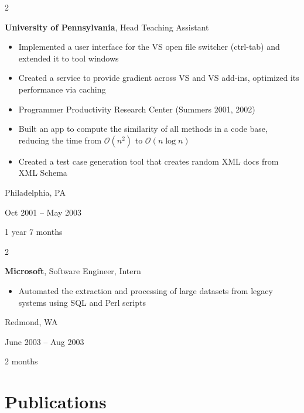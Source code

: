 \documentclass[10pt, letterpaper]{article}
\newenvironment{highlights}{
    \begin{itemize}[
        topsep=0.10 cm,
        parsep=0.10 cm,
        partopsep=0pt,
        itemsep=0pt,
        leftmargin=0.4 cm + 10pt
    ]
}{
    \end{itemize}
} %
\newenvironment{twocolentry}[2][]{
    \onecolentry
    \def\secondColumn{#2}
    \setcolumnwidth{\fill, 4.5 cm}
    \begin{paracol}{2}
}{
    \switchcolumn \raggedleft \secondColumn
    \end{paracol}
    \endonecolentry
} %
\begin{document}
        \begin{twocolentry}{
            Philadelphia, PA

        Oct 2001 – May 2003

        1 year 7 months
        }
            \textbf{University of Pennsylvania}, Head Teaching Assistant
            \begin{highlights}
                \item Implemented a user interface for the VS open file switcher (ctrl-tab) and extended it to tool windows
                \item Created a service to provide gradient across VS and VS add-ins, optimized its performance via caching
                \item Programmer Productivity Research Center (Summers 2001, 2002)
                \item Built an app to compute the similarity of all methods in a code base, reducing the time from $\mathcal{O}(n^2)$ to $\mathcal{O}(n \log n)$
                \item Created a test case generation tool that creates random XML docs from XML Schema
            \end{highlights}
        \end{twocolentry}


        \vspace{0.2 cm}

        \begin{twocolentry}{
            Redmond, WA

        June 2003 – Aug 2003

        2 months
        }
            \textbf{Microsoft}, Software Engineer, Intern
            \begin{highlights}
                \item Automated the extraction and processing of large datasets from legacy systems using SQL and Perl scripts
            \end{highlights}
        \end{twocolentry}



    
    \section{Publications}
\end{document}
